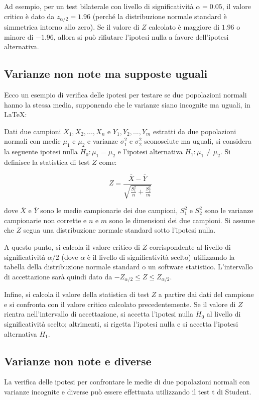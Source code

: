Ad esempio, per un test bilaterale con livello di significatività $\alpha = 0.05$, il valore critico è dato da $z_{\alpha/2} = 1.96$ (perché la distribuzione normale standard è simmetrica intorno allo zero). Se il valore di $Z$ calcolato è maggiore di $1.96$ o minore di $-1.96$, allora si può rifiutare l'ipotesi nulla a favore dell'ipotesi alternativa.


\subsection{Varianze non note ma supposte uguali}
Ecco un esempio di verifica delle ipotesi per testare se due popolazioni normali hanno la stessa media, supponendo che le varianze siano incognite ma uguali, in LaTeX:

Dati due campioni $X_1, X_2, ..., X_n$ e $Y_1, Y_2, ..., Y_m$ estratti da due popolazioni normali con medie $\mu_1$ e $\mu_2$ e varianze $\sigma^2_1$ e $\sigma^2_2$ sconosciute ma uguali, si considera la seguente ipotesi nulla $H_0: \mu_1 = \mu_2$ e l'ipotesi alternativa $H_1: \mu_1 \neq \mu_2$. Si definisce la statistica di test $Z$ come:

$$ Z = \frac{\overline{X} - \overline{Y}}{\sqrt{\frac{S_1^2}{n} + \frac{S_2^2}{m}}} $$

dove $\overline{X}$ e $\overline{Y}$ sono le medie campionarie dei due campioni, $S_1^2$ e $S_2^2$ sono le varianze campionarie non corrette e $n$ e $m$ sono le dimensioni dei due campioni. Si assume che $Z$ segua una distribuzione normale standard sotto l'ipotesi nulla.

A questo punto, si calcola il valore critico di $Z$ corrispondente al livello di significatività $\alpha/2$ (dove $\alpha$ è il livello di significatività scelto) utilizzando la tabella della distribuzione normale standard o un software statistico. L'intervallo di accettazione sarà quindi dato da $-Z_{\alpha/2} \leq Z \leq Z_{\alpha/2}$.

Infine, si calcola il valore della statistica di test $Z$ a partire dai dati del campione e si confronta con il valore critico calcolato precedentemente. Se il valore di $Z$ rientra nell'intervallo di accettazione, si accetta l'ipotesi nulla $H_0$ al livello di significatività scelto; altrimenti, si rigetta l'ipotesi nulla e si accetta l'ipotesi alternativa $H_1$.

\subsection{Varianze non note e diverse}
La verifica delle ipotesi per confrontare le medie di due popolazioni normali con varianze incognite e diverse può essere effettuata utilizzando il test t di Student.


